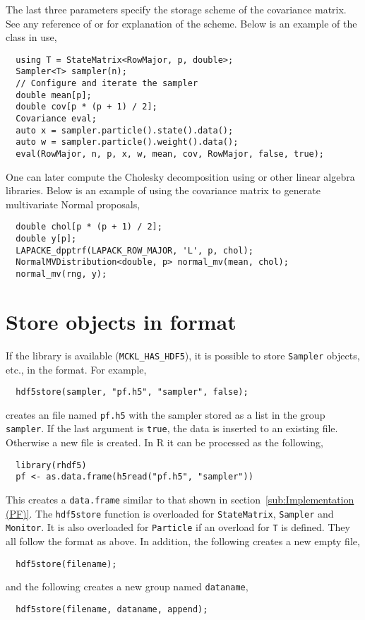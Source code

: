 The last three parameters specify the storage scheme of the covariance matrix.
See any reference of \blas or \lapack for explanation of the scheme. Below is
an example of the class in use,
\begin{Verbatim}
  using T = StateMatrix<RowMajor, p, double>;
  Sampler<T> sampler(n);
  // Configure and iterate the sampler
  double mean[p];
  double cov[p * (p + 1) / 2];
  Covariance eval;
  auto x = sampler.particle().state().data();
  auto w = sampler.particle().weight().data();
  eval(RowMajor, n, p, x, w, mean, cov, RowMajor, false, true);
\end{Verbatim}
One can later compute the Cholesky decomposition using \lapack or other linear
algebra libraries. Below is an example of using the covariance matrix to
generate multivariate Normal proposals,
\begin{Verbatim}
  double chol[p * (p + 1) / 2];
  double y[p];
  LAPACKE_dpptrf(LAPACK_ROW_MAJOR, 'L', p, chol);
  NormalMVDistribution<double, p> normal_mv(mean, chol);
  normal_mv(rng, y);
\end{Verbatim}

\section{Store objects in \protect{} format}
\label{sec:Store objects in HDF5 format}

If the \hdf library is available (\verb|MCKL_HAS_HDF5|), it is possible to
store \verb|Sampler| objects, etc., in the \hdf format. For example,
\begin{Verbatim}
  hdf5store(sampler, "pf.h5", "sampler", false);
\end{Verbatim}
creates an \hdf file named \verb|pf.h5| with the sampler stored as a list in
the group \verb|sampler|. If the last argument is \verb|true|, the data is
inserted to an existing file. Otherwise a new file is created. In R it can be
processed as the following,
\begin{Verbatim}
  library(rhdf5)
  pf <- as.data.frame(h5read("pf.h5", "sampler"))
\end{Verbatim}
This creates a \verb|data.frame| similar to that shown in
section~\ref{sub:Implementation (PF)}. The \verb|hdf5store| function is
overloaded for \verb|StateMatrix|, \verb|Sampler| and \verb|Monitor|. It is
also overloaded for \verb|Particle| if an overload for \verb|T| is defined.
They all follow the format as above. In addition, the following creates a new
empty \hdf file,
\begin{Verbatim}
  hdf5store(filename);
\end{Verbatim}
and the following creates a new group named \verb|dataname|,
\begin{Verbatim}
  hdf5store(filename, dataname, append);
\end{Verbatim}

